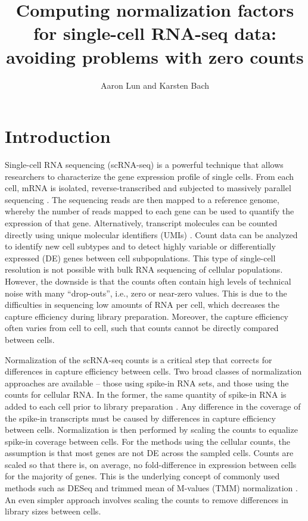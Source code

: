 \documentclass{article}
\title{Computing normalization factors for single-cell RNA-seq data: avoiding problems with zero counts}
\author{Aaron Lun and Karsten Bach}
\begin{document}
\maketitle

\section{Introduction}
Single-cell RNA sequencing (scRNA-seq) is a powerful technique that allows researchers to characterize the gene expression profile of single cells.
From each cell, mRNA is isolated, reverse-transcribed and subjected to massively parallel sequencing \cite{stegle2015computational}.
The sequencing reads are then mapped to a reference genome, whereby the number of reads mapped to each gene can be used to quantify the expression of that gene.
Alternatively, transcript molecules can be counted directly using unique molecular identifiers (UMIs) \cite{islam2014quantitative}.
Count data can be analyzed to identify new cell subtypes and to detect highly variable or differentially expressed (DE) genes between cell subpopulations.
This type of single-cell resolution is not possible with bulk RNA sequencing of cellular populations.
However, the downside is that the counts often contain high levels of technical noise with many ``drop-outs'', i.e., zero or near-zero values.
This is due to the difficulties in sequencing low amounts of RNA per cell, which decreases the capture efficiency during library preparation.
Moreover, the capture efficiency often varies from cell to cell, such that counts cannot be directly compared between cells.

Normalization of the scRNA-seq counts is a critical step that corrects for differences in capture efficiency between cells.
Two broad classes of normalization approaches are available -- those using spike-in RNA sets, and those using the counts for cellular RNA.
In the former, the same quantity of spike-in RNA is added to each cell prior to library preparation \cite{stegle2015computational}.
Any difference in the coverage of the spike-in transcripts must be caused by differences in capture efficiency between cells.
Normalization is then performed by scaling the counts to equalize spike-in coverage between cells.
For the methods using the cellular counts, the assumption is that most genes are not DE across the sampled cells.
Counts are scaled so that there is, on average, no fold-difference in expression between cells for the majority of genes.
This is the underlying concept of commonly used methods such as DESeq \cite{anders2010differential} and trimmed mean of M-values (TMM) normalization \cite{robinson2010scaling}.
An even simpler approach involves scaling the counts to remove differences in library sizes between cells.
\end{document}
